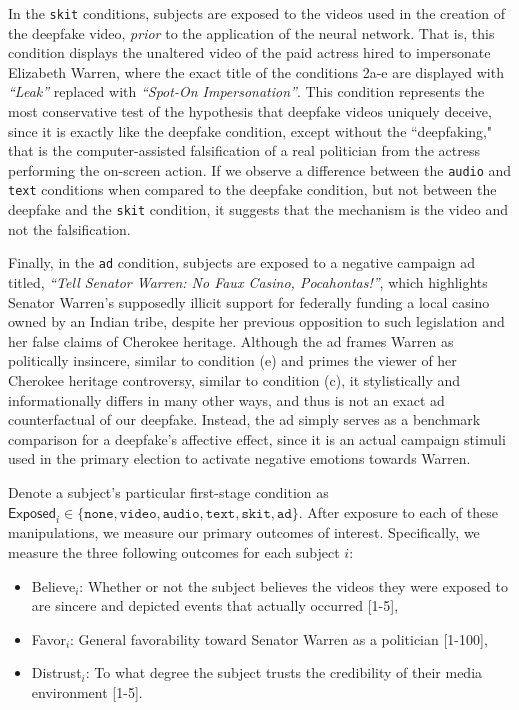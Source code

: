 \documentclass[12pt,letterpaper]{article}
\begin{document}
In the \texttt{skit} conditions, subjects are exposed to the videos used in the creation of the deepfake video, \emph{prior} to the application of the neural network. That is, this condition displays the unaltered video of the paid actress hired to impersonate Elizabeth Warren, where the exact title of the conditions 2a-e are displayed with \textit{``Leak''} replaced with \textit{``Spot-On Impersonation''}. This condition represents the most conservative test of the hypothesis that deepfake videos uniquely deceive, since it is exactly like the deepfake condition, except without the ``deepfaking," that is the computer-assisted falsification of a real politician from the actress performing the on-screen action. If we observe a difference between the \texttt{audio} and \texttt{text} conditions when compared to the deepfake condition, but not between the deepfake and the \texttt{skit} condition, it suggests that the mechanism is the video and not the falsification.

Finally, in the \texttt{ad} condition, subjects are exposed to a negative campaign ad titled, \textit{``Tell Senator Warren: No Faux Casino, Pocahontas!''}, which highlights Senator Warren's supposedly illicit support for federally funding a local casino owned by an Indian tribe, despite her previous opposition to such legislation and her false claims of Cherokee heritage. Although the ad frames Warren as politically insincere, similar to condition (e) and primes the viewer of her Cherokee heritage controversy, similar to condition (c), it stylistically and informationally differs in many other ways, and thus is not an exact ad counterfactual of our deepfake. Instead, the ad simply serves as a benchmark comparison for a deepfake's affective effect, since it is an actual campaign stimuli used in the primary election to activate negative emotions towards Warren. 

Denote a subject's particular first-stage condition as $\textsf{Exposed}_i \in \{\texttt{none},\texttt{video},\texttt{audio},\texttt{text},\texttt{skit}, \texttt{ad}\}$. After exposure to each of these manipulations, we measure our primary outcomes of interest. Specifically, we measure the three following outcomes for each subject $i$:

\begin{itemize}
    \item \textsf{Believe}$_i$: Whether or not the subject believes the videos they were exposed to are sincere and depicted events that actually occurred [1-5],
    \item \textsf{Favor}$_i$: General favorability toward Senator Warren as a politician [1-100],
    \item \textsf{Distrust}$_i$: To what degree the subject trusts the credibility of their media environment [1-5].
\end{itemize}
\end{document}
